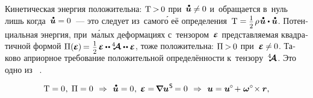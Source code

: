 \begin{otherlanguage}{russian}
\vspace{-0.1em} Кинетическая энергия положительна: ${\mathrm{T} \hspace{-0.2ex} > \hspace{-0.2ex} 0}$ при~${\mathdotabove{\bm{u}} \hspace{-0.1ex} \neq \hspace{-0.1ex} 0}$ и~обращается в~нуль лишь когда~${\mathdotabove{\bm{u}} = 0}$~--- это следует из~самог\'{о} её определения~${\mathrm{T} = \smalldisplaystyleonehalf \hspace{.2ex} \rho \hspace{0.2ex} \mathdotabove{\bm{u}} \dotp \mathdotabove{\bm{u}}}$. Потенциальная энергия, при~м\'{а}лых деформациях с~тензором~$\mathboldepsilon$ представляемая квадратичной формой
${\Pi(\hspace{-0.1ex}\mathboldepsilon\hspace{-0.1ex}) \hspace{-0.2ex}=\hspace{0.1ex} \smash{\smalldisplaystyleonehalf} \hspace{.25ex} \mathboldepsilon \hspace{-0.1ex} \dotdotp \hspace{-0.1ex} \stiffnesstensor \dotdotp \mathboldepsilon}$, тоже положительна: ${\Pi \hspace{-0.16ex} > \hspace{-0.2ex} 0}$ при~${\mathboldepsilon \hspace{-0.1ex} \neq \hspace{-0.1ex} 0}$. Таково априорное требование положительной определённости к~тензору~$\hspace{.08ex}{^4\hspace{-0.72ex}\bm{\mathcal{A}}}\hspace{.08ex}$. Это одно из ~\cite{lurie-nonlinearelasticity, truesdell-firstcourse}.



\nopagebreak\vspace{-0.16em}\begin{equation*}
\mathrm{T} = 0 \hspace{.1ex}, \; \Pi = 0
\:\,\Rightarrow\,\:
\mathdotabove{\bm{u}} = 0 \hspace{.1ex}, \; \mathboldepsilon = \hspace{-0.25ex} \boldnabla {\bm{u}}^{\hspace{0.1ex}\mathsf{S}} \hspace{-0.2ex} = 0
\:\,\Rightarrow\,\:
\bm{u} = \bm{u}^{\hspace{-0.1ex}\circ} \hspace{-0.25ex} + \hspace{.1ex} \bm{\omega}^{\circ} \hspace{-0.4ex} \times \bm{r} ,
\end{equation*}


\end{otherlanguage}
